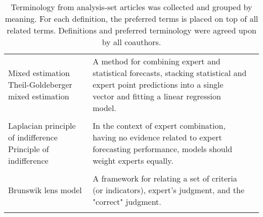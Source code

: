 \documentclass[preprint,authoryear,nonatbib]{elsarticle}
\begin{document}
\begin{longtable}{L{6cm} L{5cm} L{3cm}}
        Mixed estimation  \hspace{35mm}
        Theil-Goldeberger mixed estimation &  A method for combining expert and statistical forecasts, stacking statistical and expert point predictions into a single vector and fitting a linear regression model. & 
        \parencite{alho1992estimating,shin2013robust}\\
        \vspace{0.0625mm}\\
        
        Laplacian principle of indifference \hspace{12mm}
        Principle of indifference & In the context of expert combination, having no evidence related to expert forecasting performance, models should weight experts equally. & 
        \parencite{bolger2017deriving}\\
        \vspace{0.0625mm}\\
        
        Brunswik lens model & 
        A framework for relating a set of criteria (or indicators), expert's judgment, and the "correct" judgment. & 
        \parencite{seifert2013relative,franses2011averaging}\\
         \hline
             \caption{Terminology from analysis-set articles was collected and grouped by meaning.
              For each definition, the preferred terms is placed on top of all related terms.
              Definitions and preferred terminology were agreed upon by all coauthors.\label{tbl.terms} }\\
 
       \end{longtable}
      
\end{document}
